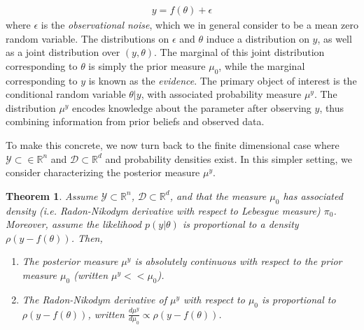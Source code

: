 \documentclass[12pt]{article}
\newcommand{\R}{\mathbb{R}}
\newtheorem{thm}{Theorem}
\begin{document}
\begin{align*}
y = f(\theta) + \epsilon
\end{align*}
where $\epsilon$ is the \textit{observational noise}, which we in general consider to be a mean zero random variable. The distributions on $\epsilon$ and $\theta$ induce a distribution on $y$, as well as a joint 
distribution over $(y, \theta)$. The marginal of this joint distribution corresponding to $\theta$ is simply the prior measure $\mu_0$, while the marginal corresponding to $y$ is known as the \textit{evidence}. The primary object of interest is the conditional random variable $\theta|y$, with associated probability measure $\mu^y$. The distribution $\mu^y$ encodes knowledge about the parameter after observing $y$, thus combining 
information from prior beliefs and observed data. 

To make this concrete, we now turn back to the finite dimensional case where $\mathcal{Y} \subset \in \R^n$ and $\mathcal{D} \subset \R^d$ and probability densities exist. In this simpler setting, we consider characterizing the posterior measure $\mu^y$. 

\begin{thm}
Assume $\mathcal{Y} \subset \R^n$, $\mathcal{D} \subset \R^d$, and that the measure $\mu_0$ has associated density (i.e. Radon-Nikodym derivative with respect to Lebesgue measure) $\pi_0$. 
Moreover, assume the likelihood $p(y|\theta)$ is proportional to a density $\rho(y - f(\theta))$. Then, 
\begin{enumerate}
\item The posterior measure $\mu^y$ is absolutely continuous with respect to the prior measure $\mu_0$ (written $\mu^y << \mu_0$). 
\item The Radon-Nikodym derivative of $\mu^y$ with respect to $\mu_0$ is proportional to $\rho(y - f(\theta))$, written $\frac{d\mu^y}{d\mu_0} \propto \rho(y - f(\theta))$. 
\end{enumerate}
\end{thm}
\end{document}

